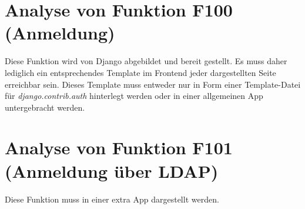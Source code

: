 \section{Analyse von Funktion F100 (Anmeldung)}
Diese Funktion wird von Django abgebildet und bereit gestellt. Es muss daher
lediglich ein entsprechendes Template im Frontend jeder dargestellten Seite
erreichbar sein. Dieses Template muss entweder nur in Form einer Template-Datei
für \emph{django.contrib.auth} hinterlegt werden oder in einer allgemeinen App
untergebracht werden.

\section{Analyse von Funktion F101 (Anmeldung über LDAP)}
Diese Funktion muss in einer extra App dargestellt werden.
